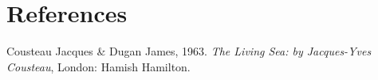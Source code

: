 \documentclass[12pt,a4paper,]{report}
\newlength{\cslhangindent}
\newenvironment{CSLReferences}[2] %
 {%
  \setlength{\parindent}{0pt}
  \ifodd #1 \everypar{\setlength{\hangindent}{\cslhangindent}}\ignorespaces\fi
  \ifnum #2 > 0
  \setlength{\parskip}{#2\baselineskip}
  \fi
 }%
 {}
\begin{document}
\footnotesize
\singlespacing
\setlength{\parindent}{0in}

\hypertarget{references}{%
\chapter*{References}\label{references}}

\hypertarget{refs}{}
\begin{CSLReferences}{1}{0}
\leavevmode{}%
Cousteau Jacques \& Dugan James, 1963. \emph{{The Living Sea: by
Jacques-Yves Cousteau}}, London: Hamish Hamilton.

\end{CSLReferences}
\end{document}
